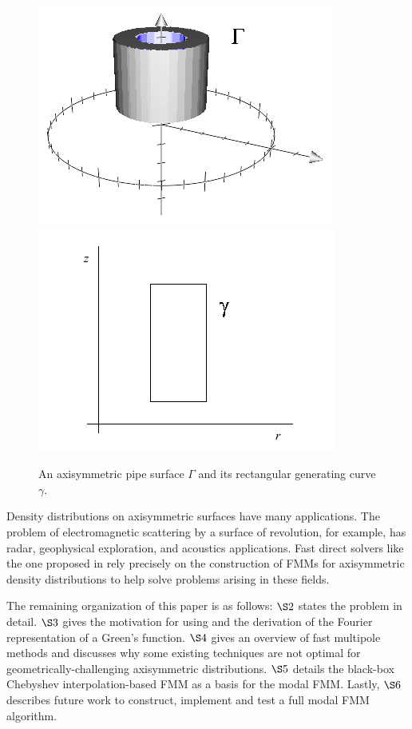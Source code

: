 \documentclass[11pt, oneside]{article}   	%
\begin{document}
\begin{figure}[h]
\caption{An axisymmetric pipe surface $\Gamma$ and its rectangular generating curve $\gamma$.}
\label{fig:3}
\centering
\includegraphics[scale=0.5]{./images/pipe2}
\includegraphics[scale=0.5]{./images/rect}
\end{figure}

Density distributions on axisymmetric surfaces have many applications. The problem of electromagnetic scattering by a surface of revolution, for example, has radar, geophysical exploration, and acoustics applications. Fast direct solvers like the one proposed in \cite{HMY} rely precisely on the construction of FMMs for axisymmetric density distributions to help solve problems arising in these fields.

The remaining organization of this paper is as follows: $\S2$ states the problem in detail. $\S3$ gives the motivation for using and the derivation of the Fourier representation of a Green's function. $\S4$ gives an overview of fast multipole methods and discusses why some existing techniques are not optimal for geometrically-challenging axisymmetric distributions. $\S5$ details the black-box Chebyshev interpolation-based FMM as a basis for the modal FMM. Lastly, $\S6$ describes future work to construct, implement and test a full modal FMM algorithm.
\end{document}
